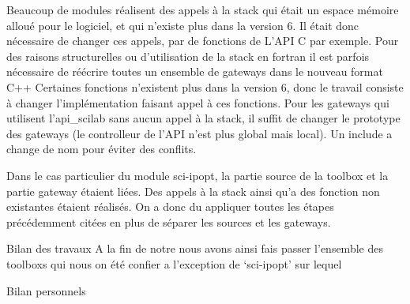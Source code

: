 Beaucoup de modules réalisent des appels à la stack qui était un espace mémoire alloué pour le logiciel, et qui n’existe plus dans la version 6. Il était donc nécessaire de changer ces appels, par de fonctions de L’API C par exemple.
Pour des raisons structurelles ou d’utilisation de la stack en fortran il est parfois nécessaire de réécrire toutes un ensemble de gateways dans le nouveau format C++
Certaines fonctions n’existent plus dans la version 6, donc le travail consiste à changer l’implémentation faisant appel à ces fonctions. 
Pour les gateways qui utilisent l’api_scilab sans aucun appel à la stack, il suffit de changer le prototype des gateways (le controlleur de l’API n’est plus global mais local). Un include a change de nom pour éviter des conflits.

Dans le cas particulier du module sci-ipopt, la partie source de la toolbox et la partie gateway étaient liées. Des appels à la stack ainsi qu’a des fonction non existantes étaient réalisés. 
On a donc du appliquer toutes les étapes précédemment citées en plus de séparer les sources et les gateways.

Bilan des travaux
A la fin de notre nous avons ainsi fais passer l’ensemble des toolboxs  qui nous on été confier a l’exception de ‘sci-ipopt’ sur lequel  

Bilan personnels

